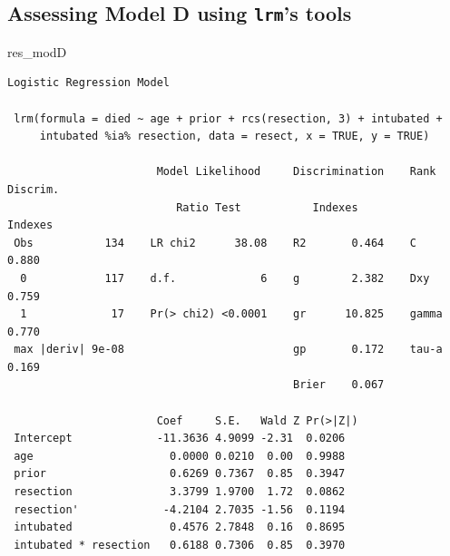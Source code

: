 \documentclass[]{book}
\newenvironment{Shaded}{\begin{snugshade}}{\end{snugshade}}
\newcommand{\KeywordTok}[1]{\textcolor[rgb]{0.13,0.29,0.53}{\textbf{#1}}}
\newcommand{\DataTypeTok}[1]{\textcolor[rgb]{0.13,0.29,0.53}{#1}}
\newcommand{\DecValTok}[1]{\textcolor[rgb]{0.00,0.00,0.81}{#1}}
\newcommand{\StringTok}[1]{\textcolor[rgb]{0.31,0.60,0.02}{#1}}
\newcommand{\OtherTok}[1]{\textcolor[rgb]{0.56,0.35,0.01}{#1}}
\newcommand{\OperatorTok}[1]{\textcolor[rgb]{0.81,0.36,0.00}{\textbf{#1}}}
\newcommand{\NormalTok}[1]{#1}
\theoremstyle{definition}
\theoremstyle{definition}
\theoremstyle{definition}
\theoremstyle{remark}
\begin{document}
\begin{Shaded}
\end{Shaded}

\subsection{\texorpdfstring{Assessing Model D using \texttt{lrm}'s
tools}{Assessing Model D using lrm's tools}}\label{assessing-model-d-using-lrms-tools}

\begin{Shaded}
\begin{Highlighting}[]
\NormalTok{res_modD}
\end{Highlighting}
\end{Shaded}

\begin{verbatim}
Logistic Regression Model
 
 lrm(formula = died ~ age + prior + rcs(resection, 3) + intubated + 
     intubated %ia% resection, data = resect, x = TRUE, y = TRUE)
 
                       Model Likelihood     Discrimination    Rank Discrim.    
                          Ratio Test           Indexes           Indexes       
 Obs           134    LR chi2      38.08    R2       0.464    C       0.880    
  0            117    d.f.             6    g        2.382    Dxy     0.759    
  1             17    Pr(> chi2) <0.0001    gr      10.825    gamma   0.770    
 max |deriv| 9e-08                          gp       0.172    tau-a   0.169    
                                            Brier    0.067                     
 
                       Coef     S.E.   Wald Z Pr(>|Z|)
 Intercept             -11.3636 4.9099 -2.31  0.0206  
 age                     0.0000 0.0210  0.00  0.9988  
 prior                   0.6269 0.7367  0.85  0.3947  
 resection               3.3799 1.9700  1.72  0.0862  
 resection'             -4.2104 2.7035 -1.56  0.1194  
 intubated               0.4576 2.7848  0.16  0.8695  
 intubated * resection   0.6188 0.7306  0.85  0.3970  
 
\end{verbatim}
\end{document}
